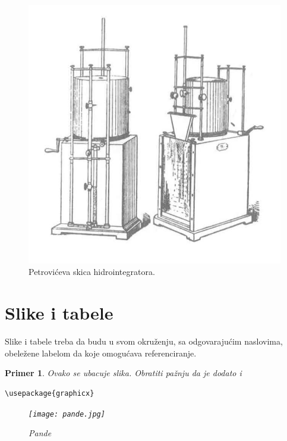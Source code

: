 \documentclass[a4paper]{article}
\newtheorem{primer}{Primer}[section]
\begin{document}
{\begin{figure}[h!]
\begin{center}
\includegraphics[scale=1.5]{h1.jpg}
\end{center}
\caption{Petrovićeva skica hidrointegratora. }
\label{fig:h1}
\end{figure}

\bigskip





\section{Slike i tabele}
\label{slike_i_tabele}

Slike i tabele treba da budu u svom okruženju, sa odgovarajućim naslovima, obeležene labelom da koje omogućava referenciranje. 

\begin{primer} Ovako se ubacuje slika. Obratiti pažnju da je dodato i 
\begin{verbatim}
\usepackage{graphicx}
\end{verbatim}

\begin{figure}[h!]
\begin{center}
\texttt{[image: pande.jpg]}
\end{center}
\caption{Pande}
\label{fig:pande}
\end{figure}


\end{primer}}
\end{document}
